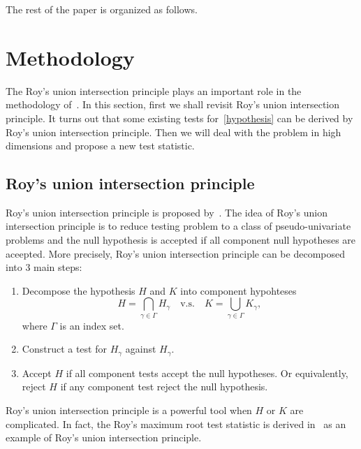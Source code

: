 \documentclass[review]{elsarticle}
\theoremstyle{plain}
\theoremstyle{definition}
\theoremstyle{remark}
\begin{document}
    The rest of the paper is organized  as follows.

    
\section{Methodology}
The Roy's union intersection principle plays an important role in the methodology of~\cite{Zhao2016A}.
In this section, first we shall revisit Roy's union intersection principle.
 It turns out that some existing tests for~\eqref{hypothesis} can be derived by Roy's union intersection principle.
 Then we will deal with the problem in high dimensions and propose a new test statistic.
\subsection{Roy's union intersection principle}
Roy's union intersection principle is proposed by~\cite{Roy1953}.
The idea of Roy's union intersection principle is to reduce testing problem to a class of pseudo-univariate problems and the null hypothesis is accepted if all component null hypotheses are aceepted.
More precisely, Roy's union intersection principle can be decomposed into $3$ main steps:
\begin{enumerate}
    \item
        Decompose the hypothesis $H$ and $K$ into component hypohteses
        $$
        H=\bigcap_{\gamma\in\Gamma} H_\gamma \quad \text{v.s.} \quad 
        K=\bigcup_{\gamma\in \Gamma} K_{\gamma},
        $$
        where $\Gamma$ is an index set.
    \item
        Construct a test for $H_{\gamma}$ against $H_{\gamma}$.
    \item
        Accept $H$ if all component tests accept the null hypotheses. Or equivalently, reject $H$ if any component test reject the null hypothesis.
\end{enumerate}

 Roy's union intersection principle is a powerful tool when $H$ or $K$ are complicated.
 In fact, the Roy's maximum root test statistic is derived in~\cite{Roy1953} as an example of Roy's union intersection principle.
\end{document}
